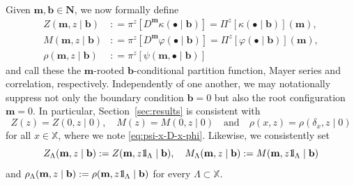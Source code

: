 \documentclass[reqno, 11pt]{amsart}
\theoremstyle{definition}
\newcommand{\X}{\mathbb X}
\def\1{{\mathchoice {1\mskip-4mu\mathrm l}      
{1\mskip-4mu\mathrm l}
{1\mskip-4.5mu\mathrm l} {1\mskip-5mu\mathrm l}}}
\begin{document}
Given $\mathbf m, \mathbf b \in \mathbf N$, we now formally define
\begin{align*}
	Z(\mathbf m, z \mid \mathbf b) & : = \pi^z[D^\mathbf m \kappa(\bullet \mid \mathbf b)] = \Pi^z[\kappa(\bullet \mid \mathbf b)](\mathbf m), \\
	M(\mathbf m, z \mid \mathbf b) & : = \pi^z[D^\mathbf m \varphi(\bullet \mid \mathbf b)] = \Pi^z[\varphi(\bullet \mid \mathbf b)](\mathbf m), \\
	\rho(\mathbf m, z \mid \mathbf b) & : = \pi^z[\psi(\mathbf m, \bullet \mid \mathbf b)]
\end{align*}
and call these the $\mathbf m$-rooted $\mathbf b$-conditional partition function, Mayer series and correlation, respectively. 
Independently of one another, we may notationally suppress not only the boundary condition $\mathbf b = 0$ but also the root configuration $\mathbf m = 0$. 
In particular, Section~\ref{sec:results} is consistent with
\[
	Z(z) = Z(0, z \mid 0), \quad M(z) = M(0, z \mid 0) \quad \text{and} \quad \rho(x, z) = \rho(\delta_x, z \mid 0)
\]
for all $x \in \X$, where we note \eqref{eq:psi-x-D-x-phi}. 
Likewise, we consistently set
\[
	Z_\Lambda(\mathbf m, z \mid \mathbf b) : = Z(\mathbf m, z \1_\Lambda \mid \mathbf b), \quad M_\Lambda (\mathbf m, z \mid \mathbf b) : = M(\mathbf m, z \1_\Lambda \mid \mathbf b)
\]
and $\rho_\Lambda(\mathbf m, z \mid \mathbf b) : = \rho(\mathbf m, z \1_\Lambda \mid \mathbf b)$ for every $\Lambda \subset \X$.
\end{document}
